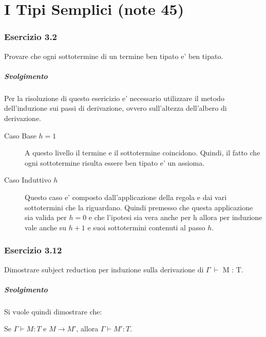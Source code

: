 \section{I Tipi Semplici (note 45)}
 
\subsubsection*{Esercizio 3.2}
Provare che ogni sottotermine di un termine ben tipato e' ben tipato.
\subparagraph{Svolgimento}
Per la risoluzione di questo esericizio e' necessario utilizzare il metodo dell'induzione sui passi di derivazione, ovvero sull'altezza dell'albero di derivazione.

\begin{description}

 \item[Caso Base $h=1$] A questo livello il termine e il sottotermine coincidono. Quindi, il fatto che ogni sottotermine risulta essere ben tipato e' un assioma.

 \item[Caso Induttivo $h$ ] Questo caso e' composto dall'applicazione della regola e dai vari sottotermini che la riguardano. Quindi premesso che questa applicazione sia valida per $h = 0$ e che l'ipotesi sia vera anche per h allora per induzione vale anche su $h + 1$ e suoi sottotermini contenuti al passo $h$.
 
 \end{description}
 
\subsubsection*{Esercizio 3.12} 
Dimostrare subject reduction per induzione sulla derivazione di $\Gamma\:\vdash$ M : T.

\subparagraph*{Svolgimento}

Si vuole quindi dimostrare che:

\begin{center}
	Se $\Gamma \vdash{} M : T$ e $M \to{} M'$, allora $\Gamma \vdash{} M' : T$.
\end{center}



